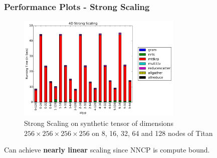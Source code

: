 \documentclass{beamer}
\begin{document}
\begin{frame}
\frametitle{Performance Plots - Strong Scaling}
\begin{figure}
\includegraphics[width=0.7\textwidth]{strsca4d}
\caption{Strong Scaling on synthetic tensor of dimensions $256 \times 256 \times 256 \times 256$ on 8, 16, 32, 64 and 128 nodes of Titan}
\end{figure}
\begin{center}
Can achieve \textbf{nearly linear} scaling since NNCP is compute bound.
\end{center}
\end{frame}
\end{document}
